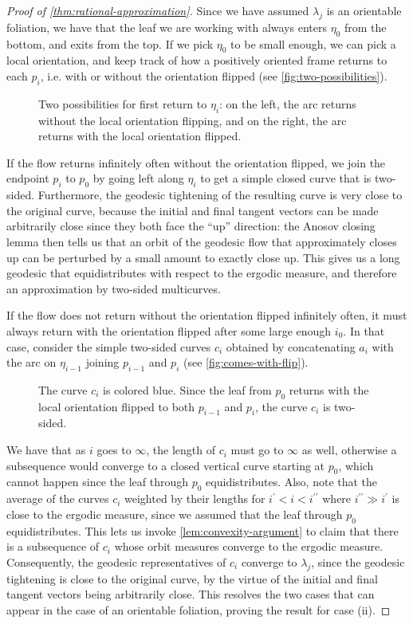 \documentclass[12pt, reqno]{amsart}
\begin{document}
\begin{proof}[Proof of \autoref{thm:rational-approximation}]
  Since we have assumed $\lambda_j$ is an orientable foliation, we have that the leaf we are working with always enters $\eta_0$ from the bottom, and exits from the top.
  If we pick $\eta_0$ to be small enough, we can pick a local orientation, and keep track of how a positively oriented frame returns to each $p_i$, i.e. with or without the orientation flipped (see \autoref{fig:two-possibilities}).
  \begin{figure}[h]
    \centering
    \caption{Two possibilities for first return to $\eta_i$: on the left, the arc returns without the local orientation flipping, and on the right, the arc returns with the local orientation flipped.}
    \label{fig:two-possibilities}
  \end{figure}
  If the flow returns infinitely often without the orientation flipped, we join the endpoint $p_i$ to $p_0$ by going left along $\eta_i$ to get a simple closed curve that is two-sided.
  Furthermore, the geodesic tightening of the resulting curve is very close to the original curve, because the initial and final tangent vectors can be made arbitrarily close since they both face the ``up'' direction: the Anosov closing lemma then tells us that an orbit of the geodesic flow that approximately closes up can be perturbed by a small amount to exactly close up.
  This gives us a long geodesic that equidistributes with respect to the ergodic measure, and therefore an approximation by two-sided multicurves.

  If the flow does not return without the orientation flipped infinitely often, it must always return with the orientation flipped after some large enough $i_0$.
  In that case, consider the simple two-sided curves $c_i$ obtained by concatenating $a_i$ with the arc on $\eta_{i-1}$ joining $p_{i-1}$ and $p_i$ (see \autoref{fig:comes-with-flip}).
  \begin{figure}[h]
    \centering
    \caption{The curve $c_i$ is colored blue. Since the leaf from $p_0$ returns with the local orientation flipped to both $p_{i-1}$ and $p_{i}$, the curve $c_i$ is two-sided.}
    \label{fig:comes-with-flip}
  \end{figure}
  We have that as $i$ goes to $\infty$, the length of $c_i$ must go to $\infty$ as well, otherwise a subsequence would converge to a closed vertical curve starting at $p_0$, which cannot happen since the leaf through $p_0$ equidistributes.
  Also, note that the average of the curves $c_i$ weighted by their lengths for $i^{\prime} < i < i^{\prime \prime}$ where $i^{\prime \prime} \gg i^{\prime}$ is close to the ergodic measure, since we assumed that the leaf through $p_0$ equidistributes.
  This lets us invoke \autoref{lem:convexity-argument} to claim that there is a subsequence of $c_i$ whose orbit measures converge to the ergodic measure.
  Consequently, the geodesic representatives of $c_i$ converge to $\lambda_j$, since the geodesic tightening is close to the original curve, by the virtue of the initial and final tangent vectors being arbitrarily close.
  This resolves the two cases that can appear in the case of an orientable foliation, proving the result for case (ii).


\end{proof}
\end{document}
